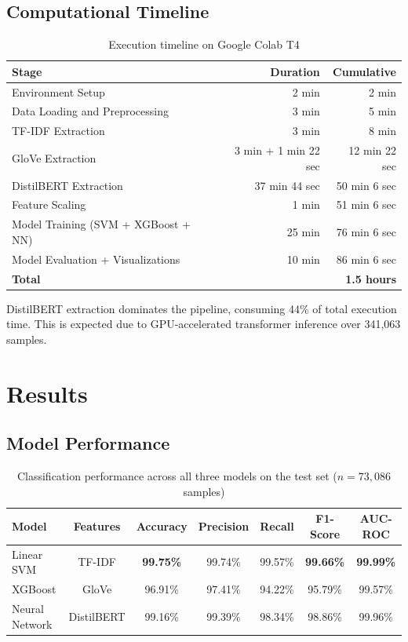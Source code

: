 \documentclass[12pt, a4paper]{article}
\begin{document}
\subsection{Computational Timeline}

\begin{table}[H]
\centering
\caption{Execution timeline on Google Colab T4}
\begin{tabular}{lrr}
\toprule
\textbf{Stage} & \textbf{Duration} & \textbf{Cumulative} \\
\midrule
Environment Setup & 2 min & 2 min \\
Data Loading and Preprocessing & 3 min & 5 min \\
TF-IDF Extraction & 3 min & 8 min \\
GloVe Extraction & 3 min + 1 min 22 sec & 12 min 22 sec \\
DistilBERT Extraction & 37 min 44 sec & 50 min 6 sec \\
Feature Scaling & 1 min & 51 min 6 sec \\
Model Training (SVM + XGBoost + NN) & 25 min & 76 min 6 sec \\
Model Evaluation + Visualizations & 10 min & 86 min 6 sec \\
\midrule
\textbf{Total} & & \textbf{~1.5 hours} \\
\bottomrule
\end{tabular}
\end{table}

DistilBERT extraction dominates the pipeline, consuming 44\% of total execution time. This is expected due to GPU-accelerated transformer inference over 341,063 samples.

\section{Results}

\subsection{Model Performance}

\begin{table}[H]
\centering
\caption{Classification performance across all three models on the test set ($n=73,086$ samples)}
\begin{tabular}{lcccccc}
\toprule
\textbf{Model} & \textbf{Features} & \textbf{Accuracy} & \textbf{Precision} & \textbf{Recall} & \textbf{F1-Score} & \textbf{AUC-ROC} \\
\midrule
Linear SVM & TF-IDF & \textbf{99.75\%} & 99.74\% & 99.57\% & \textbf{99.66\%} & \textbf{99.99\%} \\
XGBoost & GloVe & 96.91\% & 97.41\% & 94.22\% & 95.79\% & 99.57\% \\
Neural Network & DistilBERT & 99.16\% & 99.39\% & 98.34\% & 98.86\% & 99.96\% \\
\bottomrule
\end{tabular}
\end{table}
\end{document}
